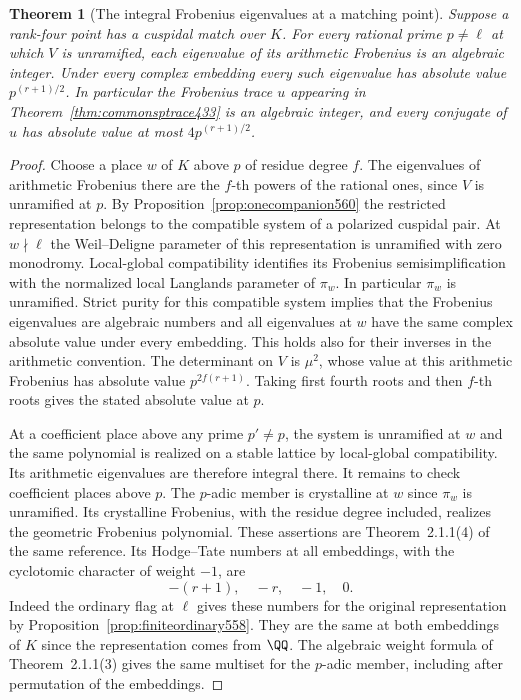 \documentclass[a4paper,11pt]{article}
\newtheorem{theorem}[proposition]{Theorem}
\theoremstyle{definition}
\theoremstyle{remark}
\numberwithin{equation}{section}
\begin{document}
\begin{theorem}[The integral Frobenius eigenvalues at a matching point]
\leavevmode\label{thm:integerpurity560}
Suppose a rank-four point has a cuspidal match over \(K\). For
every rational prime \(p\ne\ell\) at which \(V\) is unramified,
each eigenvalue of its arithmetic Frobenius is an algebraic
integer. Under every complex embedding every such eigenvalue
has absolute value \(p^{(r+1)/2}\). In particular the
Frobenius trace \(u\) appearing in
Theorem~\ref{thm:commonsptrace433} is an algebraic integer,
and every conjugate of \(u\) has absolute value at most
\(4p^{(r+1)/2}\).
\end{theorem}
\begin{proof}
Choose a place \(w\) of \(K\) above \(p\) of residue degree
\(f\). The eigenvalues of arithmetic Frobenius there are the
\(f\)-th powers of the rational ones, since \(V\) is unramified
at \(p\). By Proposition~\ref{prop:onecompanion560} the
restricted representation belongs to the compatible system of
a polarized cuspidal pair. At \(w\nmid\ell\) the Weil--Deligne
parameter of this representation is unramified with zero
monodromy. Local-global compatibility identifies its Frobenius
semisimplification with the normalized local Langlands parameter
of \(\pi_w\). In particular \(\pi_w\) is unramified.
Strict purity for this compatible system implies that the
Frobenius eigenvalues are algebraic numbers and all eigenvalues
at \(w\) have the same complex absolute value under every
embedding. This holds also for their inverses in the arithmetic
convention. The determinant on \(V\) is \(\mu^2\), whose value
at this arithmetic Frobenius has absolute value
\(p^{2f(r+1)}\). Taking first fourth roots and then \(f\)-th
roots gives the stated absolute value at \(p\).
~\cite{XII-IX-blggt560}

At a coefficient place above any prime \(p'\ne p\), the system
is unramified at \(w\) and the same polynomial is realized on
a stable lattice by local-global compatibility. Its arithmetic
eigenvalues are therefore integral there. It remains to check
coefficient places above \(p\). The \(p\)-adic member is
crystalline at \(w\) since \(\pi_w\) is unramified. Its
crystalline Frobenius, with the residue degree included,
realizes the geometric Frobenius polynomial. These assertions
are Theorem~2.1.1(4) of the same reference. Its Hodge--Tate
numbers at all embeddings, with the cyclotomic character of
weight \(-1\), are
\[
                         -(r+1),\quad-r,\quad-1,\quad0 .
\]
Indeed the ordinary flag at \(\ell\) gives these numbers for
the original representation by Proposition~\ref{prop:finiteordinary558}.
They are the same at both embeddings of \(K\) since the
representation comes from \(\QQ\). The algebraic weight formula
of Theorem~2.1.1(3) gives the same multiset for the \(p\)-adic
member, including after permutation of the embeddings.


\end{proof}
\end{document}
